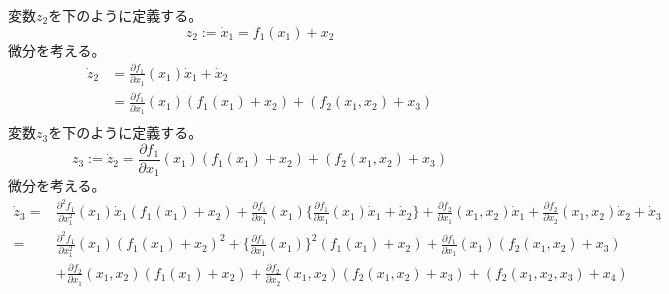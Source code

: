 \documentclass{jsarticle}
\begin{document}
変数$z_2$を下のように定義する。
\begin{equation}
  z_2 := \dot{x}_1 = f_1(x_1) + x_2
\end{equation}
微分を考える。
\begin{equation}
  \begin{aligned}
    \dot{z}_2 &= \frac{\partial f_1}{\partial x_1}(x_1)\dot{x}_1+\dot{x}_2\\
    &= \frac{\partial f_1}{\partial x_1}(x_1)( f_1(x_1) + x_2)+(f_2(x_1,x_2) +x_3)\\
  \end{aligned}
\end{equation}
変数$z_3$を下のように定義する。
\begin{equation}
  z_3 := \dot{z}_2 = \frac{\partial f_1}{\partial x_1}(x_1)( f_1(x_1) + x_2)+(f_2(x_1,x_2) +x_3)
\end{equation}
微分を考える。
\begin{equation}
  \begin{aligned}
    \dot{z}_3 = & \frac{\partial^2 f_1}{\partial x_1^2}(x_1)\dot{x}_1( f_1(x_1) + x_2) 
    + \frac{\partial f_1}{\partial x_1} (x_1)  \{ \frac{\partial f_1}{\partial x_1} (x_1)\dot{x}_1 + \dot{x}_2 \} 
    + \frac{\partial f_2} {\partial x_1} (x_1,x_2)\dot{x}_1 + \frac{\partial f_2} {\partial x_2} (x_1,x_2)\dot{x}_2 + \dot{x}_3\\
    = & \frac{\partial^2 f_1}{\partial x_1^2}(x_1)( f_1(x_1) + x_2)^2
    +  \{ \frac{\partial f_1}{\partial x_1} (x_1) \}^2( f_1(x_1) + x_2)
    + \frac{\partial f_1}{\partial x_1} (x_1) (f_2(x_1,x_2) +x_3)\\
    &+ \frac{\partial f_2} {\partial x_1} (x_1,x_2)( f_1(x_1) + x_2) + \frac{\partial f_2} {\partial x_2} (x_1,x_2) (f_2(x_1,x_2) +x_3)
    +(f_2(x_1,x_2,x_3) +x_4)
  \end{aligned}
\end{equation}
\end{document}
